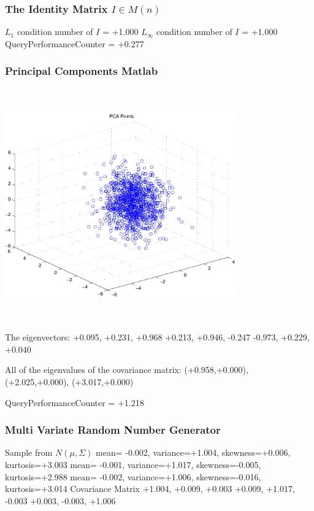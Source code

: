 \documentclass[9pt]{article}
\theoremstyle{plain}
\theoremstyle{definition}
\theoremstyle{remark}
\numberwithin{equation}{section}
\begin{document}
\subsubsection{The Identity Matrix $I \in M(n)$}
$L_1$ condition number of $I$ = +1.000
$L_\infty$ condition number of $I$ = +1.000
QueryPerformanceCounter  =  +0.277
\subsubsection{Principal Components Matlab }
\includegraphics[width=10.0cm,height=10.0cm]{PCAPoints.pdf}

The eigenvectors:
+0.095, +0.231, +0.968
+0.213, +0.946, -0.247
-0.973, +0.229, +0.040

All of the eigenvalues of the covariance matrix:
(+0.958,+0.000), (+2.025,+0.000), (+3.017,+0.000)

QueryPerformanceCounter  =  +1.218
\subsubsection{Multi Variate Random Number Generator }
Sample from $N(\mu,\Sigma)$
mean= -0.002, variance=+1.004, skewness=+0.006, kurtosis=+3.003
mean= -0.001, variance=+1.017, skewness=-0.005, kurtosis=+2.988
mean= -0.002, variance=+1.006, skewness=-0.016, kurtosis=+3.014
Covariance Matrix 
+1.004, +0.009, +0.003
+0.009, +1.017, -0.003
+0.003, -0.003, +1.006
\end{document}
